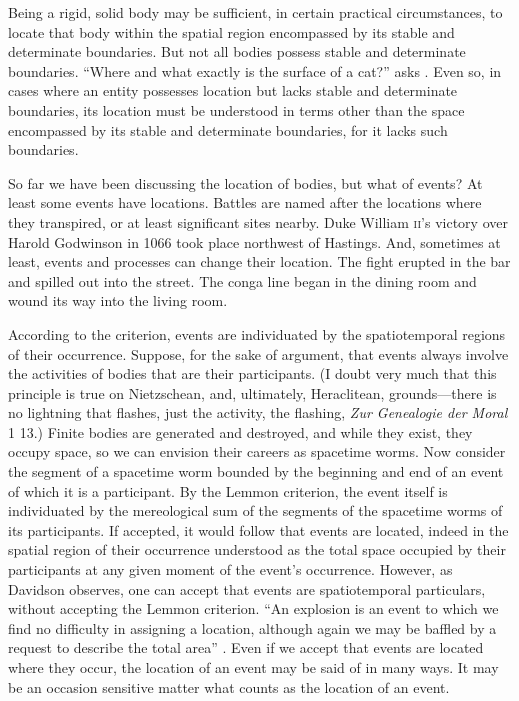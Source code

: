 Being a rigid, solid body may be sufficient, in certain practical circumstances, to locate that body within the spatial region encompassed by its stable and determinate boundaries. But not all bodies possess stable and determinate boundaries. ``Where and what exactly is the surface of a cat?'' asks \citet[lecture 9]{Austin:1962lr}. Even so, in cases where an entity possesses location but lacks stable and determinate boundaries, its location must be understood in terms other than the space encompassed by its stable and determinate boundaries, for it lacks such boundaries.

So far we have been discussing the location of bodies, but what of events? At least some events have locations. Battles are named after the locations where they transpired, or at least significant sites nearby. Duke William \textsc{ii}'s victory over Harold Godwinson in 1066 took place northwest of Hastings. And, sometimes at least, events and processes can change their location. The fight erupted in the bar and spilled out into the street. The conga line began in the dining room and wound its way into the living room.

According to the \citet{Lemmon:1967aa} criterion, events are individuated by the spatiotemporal regions of their occurrence. Suppose, for the sake of argument, that events always involve the activities of bodies that are their participants. (I doubt very much that this principle is true on Nietzschean, and, ultimately, Heraclitean, grounds---there is no lightning that flashes, just the activity, the flashing, \emph{Zur Genealogie der Moral} 1 13.) Finite bodies are generated and destroyed, and while they exist, they occupy space, so we can envision their careers as spacetime worms. Now consider the segment of a spacetime worm bounded by the beginning and end of an event of which it is a participant. By the Lemmon criterion, the event itself is individuated by the mereological sum of the segments of the spacetime worms of its participants. If accepted, it would follow that events are located, indeed in the spatial region of their occurrence understood as the total space occupied by their participants at any given moment of the event's occurrence. However, as Davidson observes, one can accept that events are spatiotemporal particulars, without accepting the Lemmon criterion. ``An explosion is an event to which we find no difficulty in assigning a location, although again we may be baffled by a request to describe the total area'' \citep[304]{Davidson:1969da}. Even if we accept that events are located where they occur, the location of an event may be said of in many ways. It may be an occasion sensitive matter what counts as the location of an event. 

